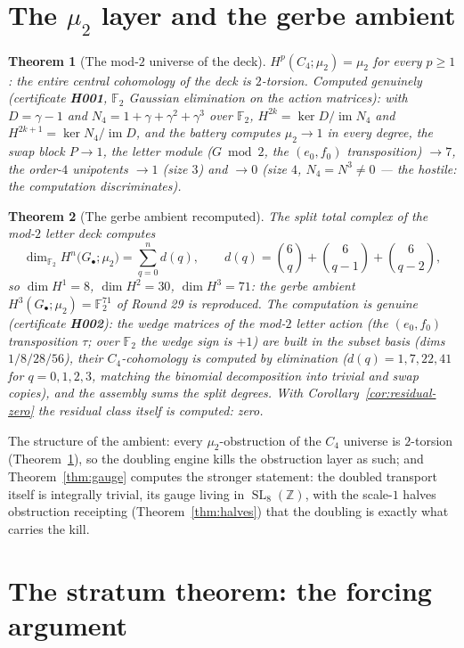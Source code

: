 \documentclass[11pt]{article}
\newcommand{\Img}{\operatorname{im}}
\newcommand{\Z}{\mathbb Z}
\newcommand{\F}{\mathbb F}
\newcommand{\SL}{\operatorname{SL}}
\newtheorem{theorem}{Theorem}[section]
\begin{document}
\section{The $\mu_2$ layer and the gerbe ambient}\label{sec:mu2}

\begin{theorem}[The mod-$2$ universe of the deck]\label{thm:mu2}
$H^p(C_4;\mu_2)=\mu_2$ for every $p\ge1$: the entire central
cohomology of the deck is $2$-torsion. Computed genuinely (certificate
\textbf{H001}, $\F_2$ Gaussian elimination on the action matrices):
with $D=\gamma-1$ and $N_4=1+\gamma+\gamma^2+\gamma^3$ over $\F_2$,
$H^{2k}=\ker D/\Img N_4$ and $H^{2k+1}=\ker N_4/\Img D$, and the
battery computes $\mu_2\to1$ in every degree, the swap block
$P\to1$, the letter module ($G\bmod2$, the $(e_0,f_0)$
transposition) $\to7$, the order-$4$ unipotents $\to1$ (size $3$)
and $\to0$ (size $4$, $N_4=N^3\ne0$ --- the hostile: the computation
discriminates).
\end{theorem}

\begin{theorem}[The gerbe ambient recomputed]\label{thm:gerbe}
The split total complex of the mod-$2$ letter deck computes
\[
\dim_{\F_2}H^n\bigl(G_\bullet;\mu_2\bigr)
=\sum_{q=0}^{n}d(q),\qquad
d(q)=\binom{6}{q}+\binom{6}{q-1}+\binom{6}{q-2},
\]
so $\dim H^1=8$, $\dim H^2=30$, $\dim H^3=71$: the gerbe ambient
$H^3(G_\bullet;\mu_2)=\F_2^{71}$ of Round 29 is reproduced. The
computation is genuine (certificate \textbf{H002}): the wedge
matrices of the mod-$2$ letter action (the $(e_0,f_0)$ transposition
$\tau$; over $\F_2$ the wedge sign is $+1$) are built in the subset
basis (dims $1/8/28/56$), their $C_4$-cohomology is computed by
elimination ($d(q)=1,7,22,41$ for $q=0,1,2,3$, matching the
binomial decomposition into trivial and swap copies), and the
assembly sums the split degrees. With Corollary~\ref{cor:residual-zero}
the residual class \emph{itself} is computed: zero.
\end{theorem}

The structure of the ambient: every $\mu_2$-obstruction of the
$C_4$ universe is $2$-torsion (Theorem~\ref{thm:mu2}), so the
doubling engine kills the obstruction layer as such; and
Theorem~\ref{thm:gauge} computes the stronger statement: the doubled
transport itself is integrally trivial, its gauge living in
$\SL_8(\Z)$, with the scale-$1$ halves obstruction receipting
(Theorem~\ref{thm:halves}) that the doubling is exactly what carries
the kill.

\section{The stratum theorem: the forcing argument}\label{sec:stratum}
\end{document}
